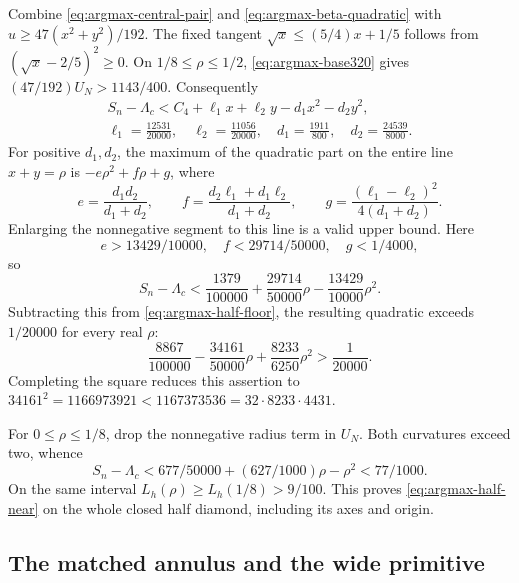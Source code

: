 Combine \eqref{eq:argmax-central-pair} and
\eqref{eq:argmax-beta-quadratic} with
$u\geq47(x^2+y^2)/192$.  The fixed tangent
$\sqrt x\leq(5/4)x+1/5$ follows from
$(\sqrt x-2/5)^2\geq0$.  On $1/8\leq\rho\leq1/2$,
\eqref{eq:argmax-base320} gives $(47/192)U_N>1143/400$.
Consequently
\begin{equation}
 \begin{gathered}
 S_n-\Lambda_c<C_4+\ell_1x+\ell_2y-d_1x^2-d_2y^2,
 \\
 \ell_1=\frac{12531}{20000},\quad\ell_2=\frac{11056}{20000},
 \quad d_1=\frac{1911}{800},\quad d_2=\frac{24539}{8000}.
 \end{gathered}
                                                        \label{eq:argmax-half-quadratic}
\end{equation}
For positive $d_1,d_2$, the maximum of the quadratic part on the entire
line $x+y=\rho$ is $-e\rho^2+f\rho+g$, where
\begin{equation}
 e=\frac{d_1d_2}{d_1+d_2},\qquad
 f=\frac{d_2\ell_1+d_1\ell_2}{d_1+d_2},\qquad
 g=\frac{(\ell_1-\ell_2)^2}{4(d_1+d_2)}.
                                                        \label{eq:argmax-radial-maximum}
\end{equation}
Enlarging the nonnegative segment to this line is a valid upper bound.
Here
\[
 e>13429/10000,\quad f<29714/50000,\quad g<1/4000,
\]
so
\[
 S_n-\Lambda_c<\frac{1379}{100000}
                  +\frac{29714}{50000}\rho-\frac{13429}{10000}\rho^2.
\]
Subtracting this from \eqref{eq:argmax-half-floor}, the resulting
quadratic exceeds $1/20000$ for every real $\rho$:
\[
 \frac{8867}{100000}-\frac{34161}{50000}\rho
                         +\frac{8233}{6250}\rho^2>\frac1{20000}.
\]
Completing the square reduces this assertion to
$34161^2=1166973921<1167373536=32\cdot8233\cdot4431$.

For $0\leq\rho\leq1/8$, drop the nonnegative radius term in $U_N$.
Both curvatures exceed two, whence
\[
 S_n-\Lambda_c<677/50000+(627/1000)\rho-\rho^2<77/1000.
\]
On the same interval $L_h(\rho)\geq L_h(1/8)>9/100$.
This proves \eqref{eq:argmax-half-near} on the whole closed half
diamond, including its axes and origin.

\subsection{The matched annulus and the wide primitive}

